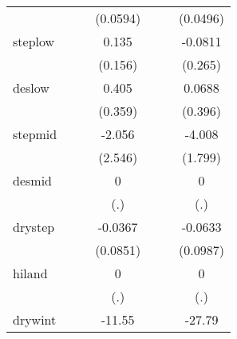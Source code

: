 {\begin{tabular}{l*{6}{c}}
            &                     &                     &    (0.0594)         &                     &                     &    (0.0496)         \\
[1em]
steplow     &                     &                     &       0.135         &                     &                     &     -0.0811         \\
            &                     &                     &     (0.156)         &                     &                     &     (0.265)         \\
[1em]
deslow      &                     &                     &       0.405         &                     &                     &      0.0688         \\
            &                     &                     &     (0.359)         &                     &                     &     (0.396)         \\
[1em]
stepmid     &                     &                     &      -2.056         &                     &                     &      -4.008\sym{*}  \\
            &                     &                     &     (2.546)         &                     &                     &     (1.799)         \\
[1em]
desmid      &                     &                     &           0         &                     &                     &           0         \\
            &                     &                     &         (.)         &                     &                     &         (.)         \\
[1em]
drystep     &                     &                     &     -0.0367         &                     &                     &     -0.0633         \\
            &                     &                     &    (0.0851)         &                     &                     &    (0.0987)         \\
[1em]
hiland      &                     &                     &           0         &                     &                     &           0         \\
            &                     &                     &         (.)         &                     &                     &         (.)         \\
[1em]
drywint     &                     &                     &      -11.55         &                     &                     &      -27.79\sym{*}  \\

\end{tabular}}
